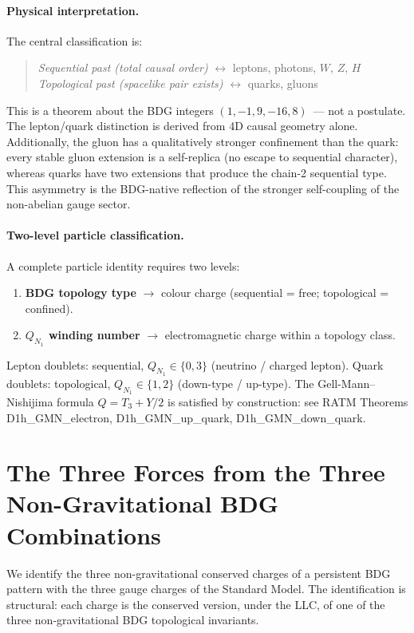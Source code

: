 \documentclass[11pt,a4paper]{article}
\begin{document}
\paragraph{Physical interpretation.}
The central classification is:
\begin{quote}
\emph{Sequential past (total causal order)} $\longleftrightarrow$
leptons, photons, $W$, $Z$, $H$ \\
\emph{Topological past (spacelike pair exists)} $\longleftrightarrow$
quarks, gluons \quad [confined]
\end{quote}
This is a theorem about the BDG integers $(1,-1,9,-16,8)$~--- not a
postulate. The lepton/quark distinction is derived from 4D causal geometry
alone. Additionally, the gluon has a qualitatively stronger confinement than
the quark: every stable gluon extension is a self-replica (no escape to
sequential character), whereas quarks have two extensions that produce the
chain-2 sequential type. This asymmetry is the BDG-native reflection of
the stronger self-coupling of the non-abelian gauge sector.

\paragraph{Two-level particle classification.}
A complete particle identity requires two levels:
\begin{enumerate}[noitemsep]
  \item \textbf{BDG topology type} $\to$ colour charge (sequential = free;
    topological = confined).
  \item \textbf{$Q_{N_1}$ winding number} $\to$ electromagnetic charge
    within a topology class.
\end{enumerate}
Lepton doublets: sequential, $Q_{N_1} \in \{0,3\}$ (neutrino / charged lepton).
Quark doublets: topological, $Q_{N_1} \in \{1,2\}$ (down-type / up-type).
The Gell-Mann--Nishijima formula $Q = T_3 + Y/2$ is satisfied by construction:
see RATM Theorems D1h\_GMN\_electron, D1h\_GMN\_up\_quark, D1h\_GMN\_down\_quark.

\section{The Three Forces from the Three Non-Gravitational BDG Combinations}
\label{sec:forces}

We identify the three non-gravitational conserved charges of a persistent
BDG pattern with the three gauge charges of the Standard Model. The
identification is structural: each charge is the conserved version, under
the LLC, of one of the three non-gravitational BDG topological invariants.
\end{document}
